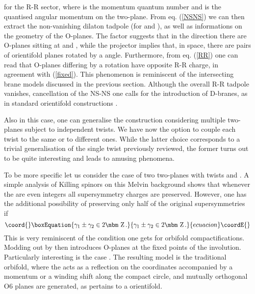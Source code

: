 \documentclass[a4paper,12pt]{article}
\def\bb#1{\hbox{\mbm #1}}
\begin{document}
for the R-R sector, where \coordHE{} is the momentum quantum number and \coordHE{}
is the quantised angular momentum on the two-plane.
From eq. (\ref{NSNS}) we can then extract the 
non-vanishing dilaton tadpole (for \coordHE{} and \coordHE{}), as well as informations
on the geometry of the O-planes. The factor \coordHE{} suggests that in
the \coordHE{} direction there are O-planes sitting at \coordHE{} and \coordHE{}, while
the projector \coordHE{} implies that, in \myHighlight{$(\rho,\varphi)$}\coordHE{} space, there are
pairs of orientifold planes rotated by a \myHighlight{$\pi$}\coordHE{} angle. Furthermore, from eq. 
(\ref{RR}) one can read that O-planes differing by a \myHighlight{$\pi$}\coordHE{} rotation have
opposite R-R charge, in agreement with (\ref{fixed}). This phenomenon is
reminiscent of the intersecting brane models discussed in the previous section.
Although the overall R-R tadpole vanishes, cancellation of the NS-NS one calls
for the introduction of D-branes, as in standard orientifold constructions
\cite{adm}.

Also in this case, one can generalise the construction considering multiple
two-planes subject to independent twists. We have now the option to couple
each twist to the same \coordHE{} or to different ones. While the latter choice
corresponds to a trivial generalisation of the single twist previously 
reviewed, the former turns out to be quite interesting and leads to amusing
phenomena. 

To be more specific let us consider the case of two 
two-planes with twists \coordHE{} and \coordHE{}. A simple analysis of Killing
spinors on this Melvin background\cite{russo2} 
shows that whenever the \coordHE{} are even 
integers all supersymmetry charges are preserved. However, one has the 
additional possibility of preserving only half of the original 
supersymmetries if
\begin{equation}\coord{}\boxEquation{
\gamma_1 \pm \gamma_2 \in 2 \bb{Z} \,.
}{
\gamma_1 \pm \gamma_2 \in 2 \bb{Z} \,.
}{ecuacion}\coordE{}\end{equation}
This is very reminiscent of the condition one gets for orbifold 
compactifications. Modding out by \coordHE{} then introduces O-planes at the fixed points of the 
involution. Particularly interesting is the case \coordHE{}. The resulting model is the traditional \myHighlight{$(\bb{C}^2 \times S^1
) /\bb{Z}_2$}\coordHE{} orbifold, where the \myHighlight{$\bb{Z}_2$}\coordHE{} acts as a reflection on the
\myHighlight{$\bb{C}^2$}\coordHE{} coordinates accompanied by a momentum or a winding shift along
the compact circle, and mutually orthogonal O6 planes are 
generated\cite{adm}, as
pertains to a \myHighlight{$(\bb{C}^2 \times S^1) /\bb{Z}_2$}\coordHE{} orientifold.
\end{document}
